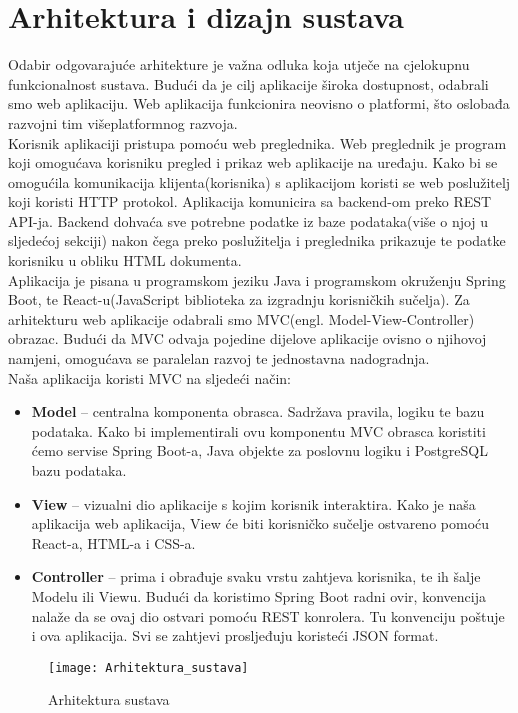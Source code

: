 \chapter{Arhitektura i dizajn sustava}
			
			
			Odabir odgovarajuće arhitekture je važna odluka koja utječe na cjelokupnu funkcionalnost sustava. Budući da je cilj aplikacije široka dostupnost, odabrali smo web aplikaciju. Web aplikacija funkcionira neovisno o platformi, što oslobađa razvojni tim višeplatformnog razvoja.\\
			Korisnik aplikaciji pristupa pomoću web preglednika. Web preglednik je program koji omogućava korisniku pregled i prikaz web aplikacije na uređaju. Kako bi se omogućila komunikacija klijenta(korisnika) s aplikacijom koristi se web poslužitelj koji koristi HTTP protokol. Aplikacija komunicira sa backend-om preko REST API-ja. Backend dohvaća sve potrebne podatke iz baze podataka(više o njoj u sljedećoj sekciji) nakon čega preko poslužitelja i preglednika prikazuje te podatke korisniku u obliku HTML dokumenta.\\
			Aplikacija je pisana u programskom jeziku Java i programskom okruženju Spring Boot, te React-u(JavaScript biblioteka za izgradnju korisničkih sučelja). Za arhitekturu web aplikacije odabrali smo MVC(engl. Model-View-Controller) obrazac. Budući da MVC odvaja pojedine dijelove aplikacije ovisno o njihovoj namjeni, omogućava se paralelan razvoj te jednostavna nadogradnja.\\
			Naša aplikacija koristi MVC na sljedeći način:
			
			\begin{itemize}
				\item \textbf{Model} – centralna komponenta obrasca. Sadržava pravila, logiku te bazu podataka. Kako bi implementirali ovu komponentu MVC obrasca koristiti ćemo servise Spring Boot-a, Java objekte za poslovnu logiku i PostgreSQL bazu podataka. 
				\item \textbf{View} – vizualni dio aplikacije s kojim korisnik interaktira. Kako je naša aplikacija web aplikacija, View će biti korisničko sučelje ostvareno pomoću React-a, HTML-a i CSS-a. 
				\item \textbf{Controller} –  prima i obrađuje svaku vrstu zahtjeva korisnika, te ih šalje Modelu ili Viewu. Budući da koristimo Spring Boot radni ovir, konvencija nalaže da se ovaj dio ostvari pomoću REST konrolera. Tu konvenciju poštuje i ova aplikacija. Svi se zahtjevi prosljeđuju koristeći JSON format.
			\end{itemize}
			\begin{figure}
				\texttt{[image: Arhitektura\_sustava]}
				\caption{Arhitektura sustava}
			\end{figure}
			
